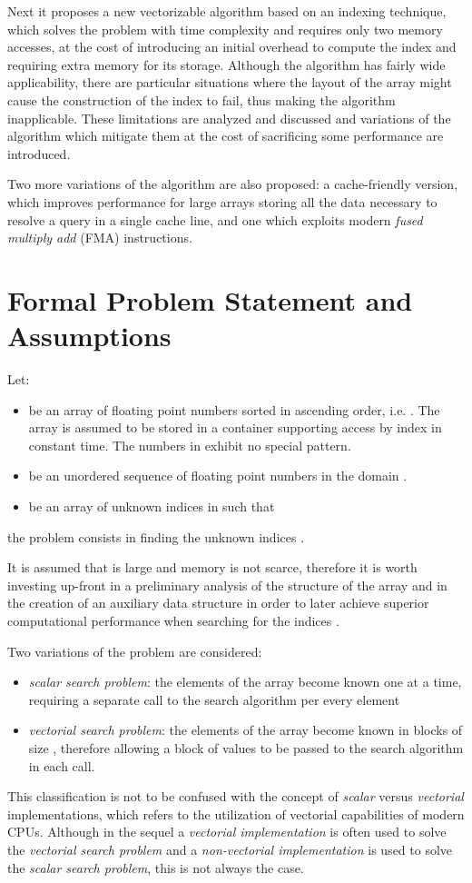 \documentclass[preprint,1p,times]{elsarticle}
\begin{document}
Next it proposes a new vectorizable algorithm based on an indexing technique, which solves the problem with time complexity  and requires only two memory accesses, at the cost of introducing an initial overhead to compute the index and requiring extra memory for its storage. Although the algorithm has fairly wide applicability, there are particular situations where the layout of the array  might cause the construction of the index to fail, thus making the algorithm inapplicable. These limitations are analyzed and discussed and variations of the algorithm which mitigate them at the cost of sacrificing some performance are introduced.

Two more variations of the algorithm are also proposed: a cache-friendly version, which improves performance for large arrays  storing all the data necessary to resolve a query in a single cache line, and one which exploits modern \textit{fused multiply add} (FMA) instructions.

\section{Formal Problem Statement and Assumptions}
\label{sec:definition}
\noindent Let: 
\begin{itemize}
	\item  be an array of  floating point numbers sorted in ascending order, i.e. .
	The array  is assumed to be stored in a container supporting access by index in constant time. The numbers in  exhibit no special pattern.
	\item  be an unordered sequence of  floating point numbers in the domain .
\item  be an array of  unknown indices in  such that 
\end{itemize}
the problem consists in finding the unknown indices .

It is assumed that  is large and memory is not scarce, therefore it is worth investing up-front in a preliminary analysis of the structure of the array  and in the creation of an auxiliary data structure in order to later achieve superior computational performance when searching for the indices .

Two variations of the problem are considered:
\begin{itemize}
\item \textit{scalar search problem}: the elements of the array  become known one at a time, requiring a separate call to the search algorithm per every element 
\item \textit{vectorial search problem}: the elements of the array  become known in blocks of size , therefore allowing a block of values  to be passed to the search algorithm in each call.
\end{itemize}
This classification is not to be confused with the concept of \textit{scalar} versus \textit{vectorial} implementations, which refers to the utilization of vectorial capabilities of modern CPUs. Although in the sequel a \textit{vectorial implementation} is often used to solve the \textit{vectorial search problem} and a \textit{non-vectorial implementation} is used to solve the \textit{scalar search problem}, this is not always the case.
\end{document}

